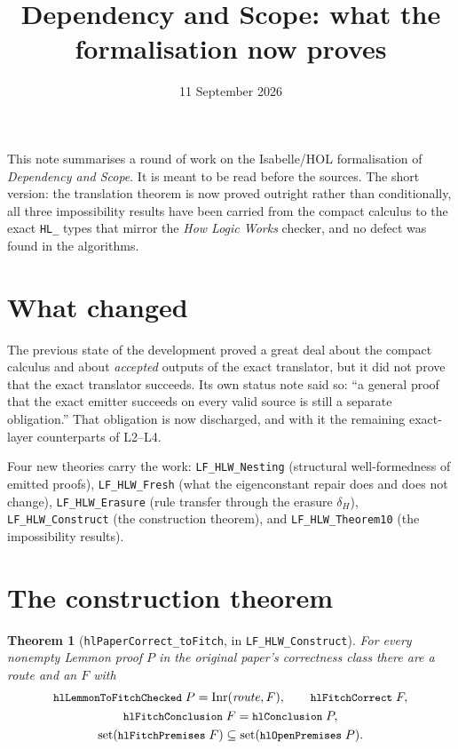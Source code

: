 \documentclass[11pt]{article}
\title{Dependency and Scope: what the formalisation now proves}
\author{}
\date{11 September 2026}
\theoremstyle{plain}
\newtheorem*{theorem*}{Theorem}
\newcommand{\isa}[1]{\texttt{\small #1}}
\begin{document}
\maketitle

\noindent
This note summarises a round of work on the Isabelle/HOL formalisation of
\emph{Dependency and Scope}. It is meant to be read before the sources. The
short version: the translation theorem is now proved outright rather than
conditionally, all three impossibility results have been carried from the
compact calculus to the exact \isa{HL\_} types that mirror the \emph{How Logic
Works} checker, and no defect was found in the algorithms.

\section{What changed}

The previous state of the development proved a great deal about the compact
calculus and about \emph{accepted} outputs of the exact translator, but it did
not prove that the exact translator succeeds. Its own status note said so: ``a
general proof that the exact emitter succeeds on every valid source is still a
separate obligation.'' That obligation is now discharged, and with it the
remaining exact-layer counterparts of L2--L4.

Four new theories carry the work: \isa{LF\_HLW\_Nesting} (structural
well-formedness of emitted proofs), \isa{LF\_HLW\_Fresh} (what the
eigenconstant repair does and does not change), \isa{LF\_HLW\_Erasure} (rule
transfer through the erasure $\delta_H$), \isa{LF\_HLW\_Construct} (the
construction theorem), and \isa{LF\_HLW\_Theorem10} (the impossibility
results).

\section{The construction theorem}

\begin{theorem*}[\isa{hlPaperCorrect\_toFitch}, in \isa{LF\_HLW\_Construct}]
For every nonempty Lemmon proof $P$ in the original paper's correctness class
there are a route and an $F$ with
\begin{gather*}
  \isa{hlLemmonToFitchChecked}\;P = \mathrm{Inr}(\mathit{route},F),
  \qquad \isa{hlFitchCorrect}\;F, \\
  \isa{hlFitchConclusion}\;F = \isa{hlConclusion}\;P, \\
  \mathrm{set}(\isa{hlFitchPremises}\;F) \subseteq
  \mathrm{set}(\isa{hlOpenPremises}\;P).
\end{gather*}
\end{theorem*}
\end{document}

